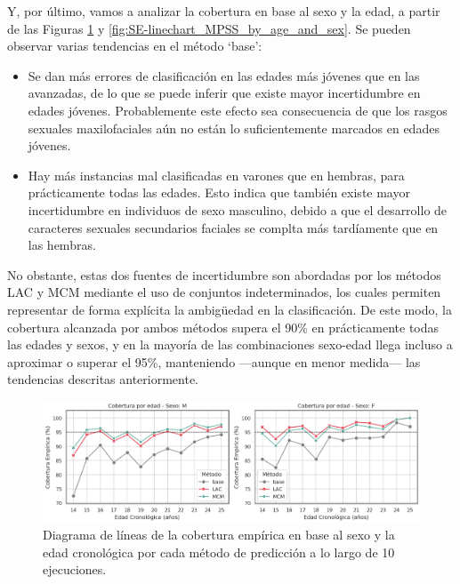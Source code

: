 Y, por último, vamos a analizar la cobertura en base al sexo y la edad, a partir de las Figuras \ref{fig:SE-linechart_EC_by_age_and_sex} y \ref{fig:SE-linechart_MPSS_by_age_and_sex}. Se pueden observar varias tendencias en el método `base':

\begin{itemize}
    \item Se dan más errores de clasificación en las edades más jóvenes que en las avanzadas, de lo que se puede inferir que existe mayor incertidumbre en edades jóvenes. Probablemente este efecto sea consecuencia de que los rasgos sexuales maxilofaciales aún no están lo suficientemente marcados en edades jóvenes.
    
    \item Hay más instancias mal clasificadas en varones que en hembras, para prácticamente todas las edades. Esto indica que también existe mayor incertidumbre en individuos de sexo masculino, debido a que el desarrollo de caracteres sexuales secundarios faciales se complta más tardíamente que en las hembras.

\end{itemize}

No obstante, estas dos fuentes de incertidumbre son abordadas por los métodos LAC y MCM mediante el uso de conjuntos indeterminados, los cuales permiten representar de forma explícita la ambigüedad en la clasificación. De este modo, la cobertura alcanzada por ambos métodos supera el 90\% en prácticamente todas las edades y sexos, y en la mayoría de las combinaciones sexo-edad llega incluso a aproximar o superar el 95\%, manteniendo ---aunque en menor medida--- las tendencias descritas anteriormente.


\begin{figure}[h]
    \centering
    \includegraphics[width=\textwidth]{apendices/imagenes/SE-linechart_EC_by_age_and_sex.png}
    \caption[
        Problema de estimación de sexo:
        Diagrama de líneas de la cobertura empírica en base al sexo y la edad cronológica por cada método de predicción a lo largo de 10 ejecuciones.
    ]{
        Diagrama de líneas de la cobertura empírica en base al sexo y la edad cronológica por cada método de predicción a lo largo de 10 ejecuciones.
    }
    \label{fig:SE-linechart_EC_by_age_and_sex}
\end{figure}


